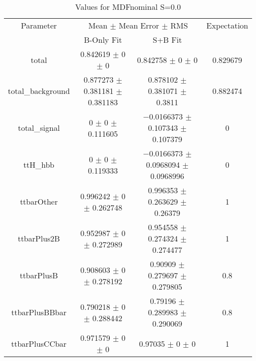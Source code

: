 \begin{table}
\centering
\caption{Values for MDFnominal S=0.0}
\begin{tabular}{cccc}
\toprule
Parameter & \multicolumn{2}{c}{Mean $\pm$ Mean Error $\pm$ RMS} & Expectation\\
 & B-Only Fit & S+B Fit & \\
\midrule
total & \num{0.842619} $\pm$ \num{0} $\pm$ \num{0} & \num{0.842758} $\pm$ \num{0} $\pm$ \num{0} & \num{0.829679}\\
total\_background & \num{0.877273} $\pm$ \num{0.381181} $\pm$ \num{0.381183} & \num{0.878102} $\pm$ \num{0.381071} $\pm$ \num{0.3811} & \num{0.882474}\\
total\_signal & \num{0} $\pm$ \num{0} $\pm$ \num{0.111605} & \num{-0.0166373} $\pm$ \num{0.107343} $\pm$ \num{0.107379} & \num{0}\\
ttH\_hbb & \num{0} $\pm$ \num{0} $\pm$ \num{0.119333} & \num{-0.0166373} $\pm$ \num{0.0968094} $\pm$ \num{0.0968996} & \num{0}\\
ttbarOther & \num{0.996242} $\pm$ \num{0} $\pm$ \num{0.262748} & \num{0.996353} $\pm$ \num{0.263629} $\pm$ \num{0.26379} & \num{1}\\
ttbarPlus2B & \num{0.952987} $\pm$ \num{0} $\pm$ \num{0.272989} & \num{0.954558} $\pm$ \num{0.274324} $\pm$ \num{0.274477} & \num{1}\\
ttbarPlusB & \num{0.908603} $\pm$ \num{0} $\pm$ \num{0.278192} & \num{0.90909} $\pm$ \num{0.279697} $\pm$ \num{0.279805} & \num{0.8}\\
ttbarPlusBBbar & \num{0.790218} $\pm$ \num{0} $\pm$ \num{0.288442} & \num{0.79196} $\pm$ \num{0.289983} $\pm$ \num{0.290069} & \num{0.8}\\
ttbarPlusCCbar & \num{0.971579} $\pm$ \num{0} $\pm$ \num{0} & \num{0.97035} $\pm$ \num{0} $\pm$ \num{0} & \num{1}\\
\bottomrule
\end{tabular}
\end{table}